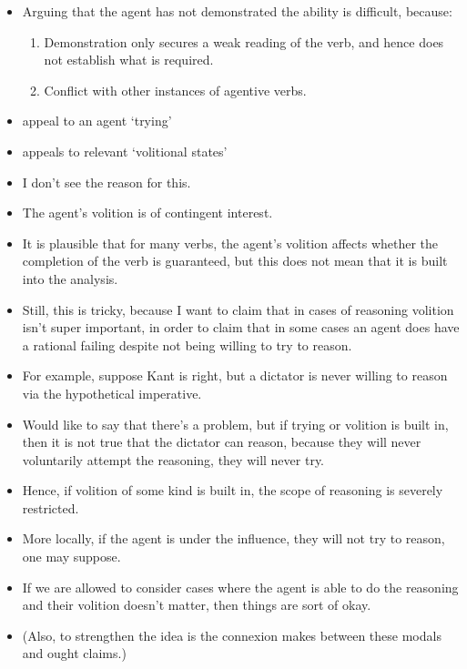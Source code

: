 \documentclass[10pt]{article}
\begin{document}
\begin{itemize}
\item Arguing that the agent has not demonstrated the ability is difficult, because:
  \begin{enumerate}
  \item Demonstration only secures a weak reading of the verb, and hence does not establish what is required.
  \item Conflict with other instances of agentive verbs.
  \end{enumerate}
\end{itemize}

\begin{itemize}
\item \cite{Mandelkern:2017aa} appeal to an agent `trying'
\item \cite{Schwarz:2020aa} appeals to relevant `volitional states'
\item I don't see the reason for this.
\item The agent's volition is of contingent interest.
\item It is plausible that for many verbs, the agent's volition affects whether the completion of the verb is guaranteed, but this does not mean that it is built into the analysis.
\item Still, this is tricky, because I want to claim that in cases of reasoning volition isn't super important, in order to claim that in some cases an agent does have a rational failing despite not being willing to try to reason.
\item For example, suppose Kant is right, but a dictator is never willing to reason via the hypothetical imperative.
\item Would like to say that there's a problem, but if trying or volition is built in, then it is not true that the dictator can reason, because they will never voluntarily attempt the reasoning, they will never try.
\item Hence, if volition of some kind is built in, the scope of reasoning is severely restricted.
\item More locally, if the agent is under the influence, they will not try to reason, one may suppose.
\item If we are allowed to consider cases where the agent is able to do the reasoning and their volition doesn't matter, then things are sort of okay.
\item (Also, to strengthen the idea is the connexion \citeauthor{Schwarz:2020aa} makes between these modals and ought claims.)

\end{itemize}
\end{document}
